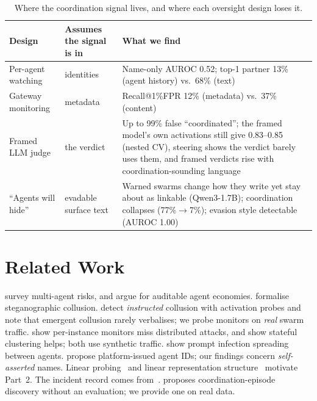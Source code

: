 \documentclass[10.5pt]{article}
\begin{document}
\begin{table}[t]
\centering\small
\caption{Where the coordination signal lives, and where each oversight design loses it.}
\label{tab:verdicts}
\begin{tabularx}{\linewidth}{>{\raggedright\arraybackslash}p{3.2cm}>{\raggedright\arraybackslash}p{3.5cm}>{\raggedright\arraybackslash}X}
\toprule
\textbf{Design} & \textbf{Assumes the signal is in} & \textbf{What we find} \\
\midrule
Per-agent watching & identities & Name-only AUROC 0.52; top-1 partner 13\% (agent history) vs.\ 68\% (text) \\
Gateway monitoring & metadata & Recall@1\%FPR 12\% (metadata) vs.\ 37\% (content) \\
Framed LLM judge & the verdict & Up to 99\% false ``coordinated''; the framed model's own activations still give 0.83--0.85 (nested CV), steering shows the verdict barely uses them, and framed verdicts rise with coordination-sounding language \\
``Agents will hide'' & evadable surface text & Warned swarms change how they write yet stay about as linkable (Qwen3-1.7B); coordination collapses (77\%$\to$7\%); evasion style detectable (AUROC 1.00) \\
\bottomrule
\end{tabularx}
\end{table}

\section{Related Work}
\citet{hammond2025multiagent} survey multi-agent risks, and \citet{tomasev2025distributional} argue for auditable agent economies. \citet{motwani2024secret} formalise steganographic collusion. \citet{rose2026collusion} detect \emph{instructed} collusion with activation probes and note that emergent collusion rarely verbalises; we probe monitors on \emph{real} swarm traffic. \citet{makins2026multiagent} show per-instance monitors miss distributed attacks, and \citet{brown2026stateful} show stateful clustering helps; both use synthetic traffic. \citet{lee2024prompt} show prompt infection spreading between agents. \citet{chan2024ids,chan2025infrastructure} propose platform-issued agent IDs; our findings concern \emph{self-asserted} names. Linear probing~\cite{alain2016probes} and linear representation structure~\cite{marks2023geometry,burns2022latent} motivate Part~2. The incident record comes from~\cite{wijk2026hf,forman2026swarmtraces,collusionwiki2026,elasky2026encoded}. \citet{frank2026counterswarm} proposes coordination-episode discovery without an evaluation; we provide one on real data.
\end{document}
